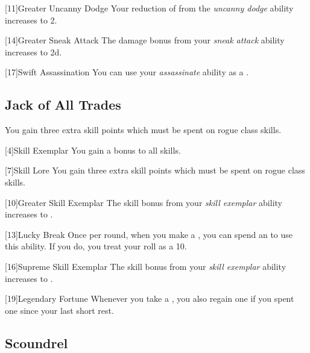             [11]{Greater Uncanny Dodge}
            Your reduction of  from the \textit{uncanny dodge} ability increases to 2.

            [14]{Greater Sneak Attack}
            The damage bonus from your \textit{sneak attack} ability increases to \plus2d.

            [17]{Swift Assassination} You can use your \textit{assassinate} ability as a .

        \subsection{Jack of All Trades}

             You gain three extra skill points which must be spent on rogue class skills.

            [4]{Skill Exemplar} You gain a  bonus to all skills.

            [7]{Skill Lore} You gain three extra skill points which must be spent on rogue class skills.

            [10]{Greater Skill Exemplar} The skill bonus from your \textit{skill exemplar} ability increases to .

            [13]{Lucky Break} Once per round, when you make a , you can spend an  to use this ability.
            If you do, you treat your roll as a 10.

            [16]{Supreme Skill Exemplar} The skill bonus from your \textit{skill exemplar} ability increases to .

            [19]{Legendary Fortune} Whenever you take a , you also regain one  if you spent one since your last short rest.

        \subsection{Scoundrel}

